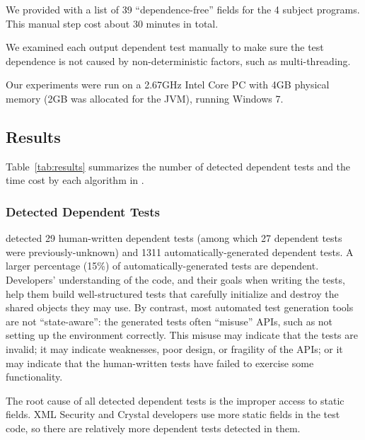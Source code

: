 We provided \ourtool with a list of 39 ``dependence-free'' fields
for the 4 subject programs. This manual step cost
about 30 minutes in total.


We examined each output dependent test manually to make
sure the test dependence is not caused by non-deter\-min\-istic
factors, such as multi-threading.

Our experiments were run on a 2.67GHz Intel Core PC
with 4GB physical memory (2GB was allocated for the JVM),
running Windows 7.

\subsection{Results}

Table~\ref{tab:results} summarizes the number of detected
dependent tests and the time cost by each algorithm
in \ourtool.

\subsubsection{Detected Dependent Tests}
\label{sec:detectedtests}


\ourtool detected 29 human-written dependent tests (among which 27
dependent tests were previously-unknown) and 1311
automatically-generated dependent tests.  A larger percentage (15\%) of
automatically-generated tests are dependent.  Developers' understanding of
the code, and their goals when writing the tests, help them build
well-structured tests that carefully initialize and destroy the shared
objects they may use.
By contrast,  most automated test generation tools are not ``state-aware'': the
generated tests often ``misuse'' APIs, such as not setting up
the environment correctly.  This misuse may
indicate that the tests are invalid; it may indicate weaknesses, poor
design, or fragility of the APIs; or it may indicate that the human-written
tests have failed to exercise some functionality.

The root cause of all detected dependent tests is the improper access to
static fields. XML Security and Crystal developers use more
static fields in the test code,
so there are relatively more dependent tests detected in them.


